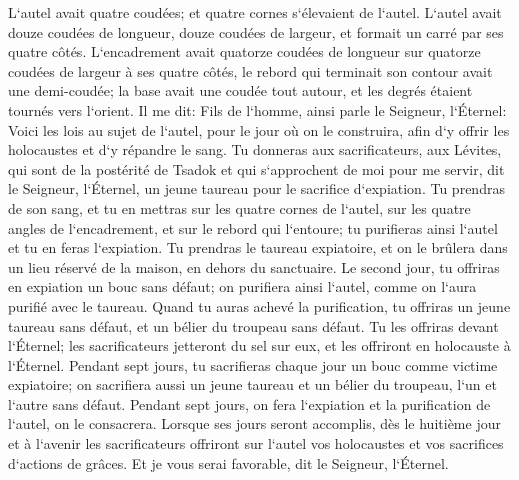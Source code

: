 \verse L`autel avait quatre coudées; et quatre cornes s`élevaient de l`autel. 
\verse L`autel avait douze coudées de longueur, douze coudées de largeur, et formait un carré par ses quatre côtés. 
\verse L`encadrement avait quatorze coudées de longueur sur quatorze coudées de largeur à ses quatre côtés, le rebord qui terminait son contour avait une demi-coudée; la base avait une coudée tout autour, et les degrés étaient tournés vers l`orient. 
\verse Il me dit: Fils de l`homme, ainsi parle le Seigneur, l`Éternel: Voici les lois au sujet de l`autel, pour le jour où on le construira, afin d`y offrir les holocaustes et d`y répandre le sang. 
\verse Tu donneras aux sacrificateurs, aux Lévites, qui sont de la postérité de Tsadok et qui s`approchent de moi pour me servir, dit le Seigneur, l`Éternel, un jeune taureau pour le sacrifice d`expiation. 
\verse Tu prendras de son sang, et tu en mettras sur les quatre cornes de l`autel, sur les quatre angles de l`encadrement, et sur le rebord qui l`entoure; tu purifieras ainsi l`autel et tu en feras l`expiation. 
\verse Tu prendras le taureau expiatoire, et on le brûlera dans un lieu réservé de la maison, en dehors du sanctuaire. 
\verse Le second jour, tu offriras en expiation un bouc sans défaut; on purifiera ainsi l`autel, comme on l`aura purifié avec le taureau. 
\verse Quand tu auras achevé la purification, tu offriras un jeune taureau sans défaut, et un bélier du troupeau sans défaut. 
\verse Tu les offriras devant l`Éternel; les sacrificateurs jetteront du sel sur eux, et les offriront en holocauste à l`Éternel. 
\verse Pendant sept jours, tu sacrifieras chaque jour un bouc comme victime expiatoire; on sacrifiera aussi un jeune taureau et un bélier du troupeau, l`un et l`autre sans défaut. 
\verse Pendant sept jours, on fera l`expiation et la purification de l`autel, on le consacrera. 
\verse Lorsque ses jours seront accomplis, dès le huitième jour et à l`avenir les sacrificateurs offriront sur l`autel vos holocaustes et vos sacrifices d`actions de grâces. Et je vous serai favorable, dit le Seigneur, l`Éternel. 

\chapter{}

